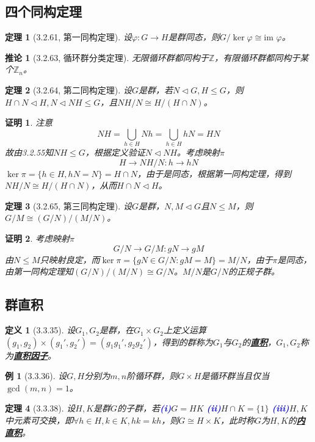 \documentclass[landscape, a4paper]{article}
\theoremstyle{compact}
\newtheorem{theorem}{定理}
\newtheorem{example}{例}
\newtheorem{corollary}{推论}
\newtheorem{definition}{定义}
\newtheorem{Proof}{证明}
\def\obj#1{\textbf{\uline{#1}}}
\def\num#1{\textnormal{\textbf{\mbox{\textcolor{blue}{(#1)}}}}}
\def\le{\leqslant}
\def\im{\text{im }}
\begin{document}
\begin{multicols}{3}
\subsection{四个同构定理}
\begin{theorem}[3.2.61, 第一同构定理]
	设$\varphi: G \to H$是群同态，则$G / \ker \varphi \cong \im \varphi$。
\end{theorem}
\begin{corollary}[3.2.63, 循环群分类定理]
	无限循环群都同构于$\mathbb Z$，有限循环群都同构于某个$\mathbb Z_n$。
\end{corollary}
\begin{theorem}[3.2.64, 第二同构定理]
	设$G$是群，若$N \triangleleft G, H \le G$，则$H \cap N \triangleleft H, N \triangleleft NH \le G$，且$NH/N \cong H/(H\cap N)$。
\end{theorem}
\begin{Proof}
	注意$$NH = \bigcup_{h \in H}Nh = \bigcup_{h \in H}hN = HN$$
	故由3.2.55知$NH \le G$，根据定义验证$N \triangleleft NH$。考虑映射$\pi$$$H \to NH/N: h \to hN$$$\ker \pi = \{h \in H, hN = N\} = H \cap N$，由于是同态，根据第一同构定理，得到$NH/N \cong H / (H\cap N)$，从而$H\cap N \triangleleft H$。
\end{Proof}
\begin{theorem}[3.2.65, 第三同构定理]
	设$G$是群，$N, M \triangleleft G$且$N \le M$，则$G / M \cong (G/N) / (M / N)$。
\end{theorem}
\begin{Proof}
	考虑映射$\pi$
	$$G/N \to G / M: gN \to gM$$由$N \le M$只映射良定，而$\ker \pi = \{gN \in G/N: gM = M\} = M/N$，由于$\pi$是同态，由第一同构定理知$(G/N) / (M/N) \cong G/N$。$M/N$是$G/N$的正规子群。
\end{Proof}

\subsection{群直积}
\begin{definition}[3.3.35]
	设$G_1, G_2$是群，在$G_1 \times G_2$上定义运算$(g_1, g_2) \times (g_1', g_2') = (g_1g_1', g_2g_2')$，得到的群称为$G_1$与$G_2$的\obj{直积}，$G_1, G_2$称为\obj{直积因子}。
\end{definition}
\begin{example}[3.3.36]
	设$G, H$分别为$m, n$阶循环群，则$G \times H$是循环群当且仅当$\gcd(m, n) = 1$。
\end{example}
\begin{theorem}[3.3.38]
	设$H, K$是群$G$的子群，若\num{i}$G = HK$ \num{ii}$H \cap K = \{1\}$ \num{iii}$H, K$中元素可交换，即$\forall h \in H, k \in K, hk = kh$，则$G \cong H \times K$，此时称$G$为$H, K$的\obj{内直积}。
\end{theorem}


\end{multicols}
\end{document}
